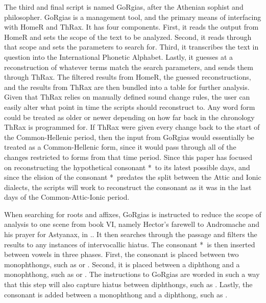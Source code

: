 The third and final script is named GoRgias, after the Athenian sophist and philosopher. GoRgias is a management tool, and the primary means of interfacing with HomeR and ThRax. It has four components. First, it reads the output from HomeR and sets the scope of the text to be analyzed. Second, it reads through that scope and sets the parameters to search for. Third, it transcribes the text in question into the International Phonetic Alphabet. Lastly, it guesses at a reconstruction of whatever terms match the search parameters, and sends them through ThRax. The filtered results from HomeR, the guessed reconstructions, and the results from ThRax are then bundled into a table for further analysis. Given that ThRax relies on manually defined sound change rules, the user can easily alter what point in time the scripts should reconstruct to. Any word form could be treated as older or newer depending on how far back in the chronology ThRax is programmed for. If ThRax were given every change back to the start of the Common-Hellenic period, then the input from GoRgias would essentially be treated as a Common-Hellenic form, since it would pass through all of the changes restricted to forms from that time period.  Since this paper has focused on reconstructing the hypothetical consonant *\w\ to its latest possible days, and since the elision of the consonant *\w\ predates the split between the Attic and Ionic dialects, the scripts will work to reconstruct the consonant as it was in the last days of the Common-Attic-Ionic period. 

When searching for roots and affixes, GoRgias is instructed to reduce the scope of analysis to one scene from book VI, namely  Hector's farewell to Andromache and his prayer for Astyanax, in .. It then searches through the passage and filters the results to any instances of intervocallic hiatus. The consonant *\w\ is then inserted between vowels in three phases. First, the consonant is placed between two monophthongs, such as  or . Second, it is placed between a diphthong and a monophthong, such as  or . The instructions to GoRgias are worded in such a way that this step will also capture hiatus between diphthongs, such as . Lastly, the consonant is added between a monophthong and a diphthong, such as . 



